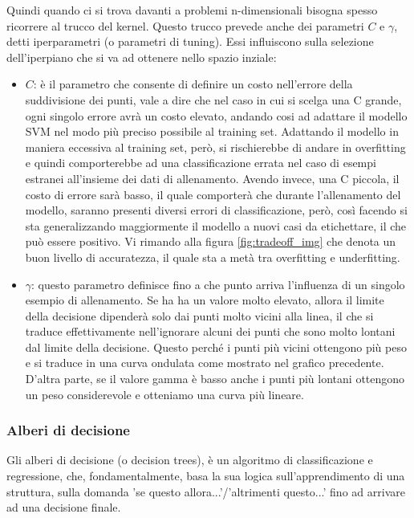 \documentclass[12pt,italian]{report}
\begin{document}
Quindi quando ci si trova davanti a problemi n-dimensionali bisogna spesso ricorrere al trucco del kernel. Questo trucco prevede anche dei parametri $ C $ e $ \gamma $, detti iperparametri (o parametri di tuning).
Essi influiscono sulla selezione dell'iperpiano che si va ad ottenere nello spazio inziale:
\begin{itemize}
	\item $C$: è il parametro che consente di definire un costo nell'errore della suddivisione dei punti, vale a dire che nel caso in cui si scelga una C grande, ogni singolo errore avrà un costo elevato, andando cosi ad adattare il modello SVM nel modo più preciso possibile al training set. Adattando il modello in maniera eccessiva al training set, però, si rischierebbe di andare in overfitting e quindi comporterebbe ad una classificazione errata nel caso di esempi estranei all'insieme dei dati di allenamento. Avendo invece, una C piccola, il costo di errore sarà basso, il quale comporterà che durante l'allenamento del modello, saranno presenti diversi errori di classificazione, però, così facendo si sta generalizzando maggiormente il modello a nuovi casi da etichettare, il che può essere positivo. Vi rimando alla figura \ref{fig:tradeoff_img} che denota un buon livello di accuratezza, il quale sta a metà tra overfitting e underfitting.
	
	\item $\gamma$: questo parametro definisce fino a che punto arriva l'influenza di un singolo esempio di allenamento. Se ha ha un valore molto elevato, allora il limite della decisione dipenderà solo dai punti molto vicini alla linea, il che si traduce effettivamente nell'ignorare alcuni dei punti che sono molto lontani dal limite della decisione. Questo perché i punti più vicini ottengono più peso e si traduce in una curva ondulata come mostrato nel grafico precedente. D'altra parte, se il valore gamma è basso anche i punti più lontani ottengono un peso considerevole e otteniamo una curva più lineare.
\end{itemize}


\pagebreak

\subsubsection{Alberi di decisione}

Gli alberi di decisione (o decision trees), è un algoritmo di classificazione e regressione, che, fondamentalmente, basa la sua logica sull'apprendimento di una struttura, sulla domanda 'se questo allora...'/'altrimenti questo...' fino ad arrivare ad una decisione finale.
\end{document}
